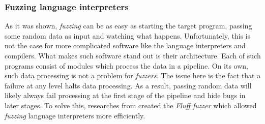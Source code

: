 \subsubsection{Fuzzing language interpreters}
As it was shown, \textit{fuzzing} can be as easy as starting the target program, passing some random data as input and watching what happens. Unfortunately, this is not the case for more complicated software like the language interpreters and compilers. What makes such software stand out is their architecture. Each of such programs consist of modules which process the data in a pipeline. On its own, such data processing is not a problem for \textit{fuzzers}. The issue here is the fact that a failure at any level halts data processing. As a result, passing random data will likely always fail processing at the first stage of the pipeline and hide bugs in later stages. To solve this, researches from \cite{dominiak2019efficient} created the \textit{Fluff fuzzer} which allowed \textit{fuzzing} language interpreters more efficiently.

